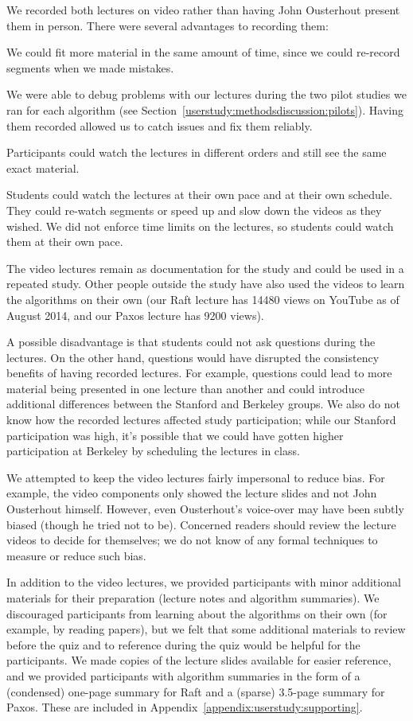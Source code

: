 We recorded both lectures on video rather than having John Ousterhout
present them in person. There were several advantages to recording them:
\begin{compactitem}
\item We could fit more material in the same amount of time, since we
could re-record segments when we made mistakes.
\item We were able to debug problems with our lectures during the two
pilot studies we ran for each algorithm
(see Section~\ref{userstudy:methodsdiscussion:pilots}).
Having them recorded allowed us to catch issues and fix them reliably.
\item Participants could watch the lectures in different orders and
still see the same exact material.
\item Students could watch the lectures at their own pace and at their
own schedule. They could re-watch segments or speed up and slow down the
videos as they wished. We did not enforce time limits on the lectures,
so students could watch them at their own pace.
\item The video lectures remain as documentation for the study and could
be used in a repeated study. Other people outside the study have also
used the videos to learn the algorithms on their own
(our Raft lecture has \num{14480} views on YouTube as of August 2014,
and our Paxos lecture has \num{9200} views).
\end{compactitem}
A possible disadvantage is that students could not ask questions during
the lectures. On the other hand, questions would have disrupted the
consistency benefits of having recorded lectures. For example, questions
could lead to more material being presented in one lecture than another
and could introduce additional differences between the Stanford and
Berkeley groups. We also do not know
how the recorded lectures affected study participation; while our
Stanford participation was high, it's possible that
we could have gotten higher participation at Berkeley by scheduling the
lectures in class.

We attempted to keep the video lectures fairly impersonal to reduce
bias. For example, the video components only showed the lecture slides
and not John Ousterhout himself. However, even Ousterhout's voice-over may
have been subtly biased (though he tried not to be). Concerned readers
should review the lecture videos to decide for themselves; we do not
know of any formal techniques to measure or reduce such bias.

In addition to the video lectures, we provided participants with minor
additional materials for their preparation (lecture notes and algorithm
summaries). We discouraged participants from learning about the
algorithms on their own (for example, by reading papers), but we felt
that some additional materials to review before the quiz and to reference
during the quiz would be helpful for the participants. We made copies of
the lecture slides available for easier reference, and we provided
participants with algorithm summaries in the form of a (condensed)
one-page summary for Raft and a (sparse) 3.5-page summary for Paxos.
These are included in Appendix~\ref{appendix:userstudy:supporting}.



